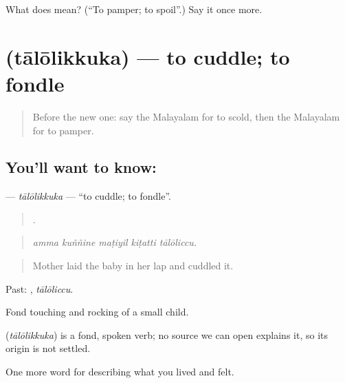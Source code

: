 \begin{tcolorbox}[breakable,colback=teal!4,colframe=teal!35!black,title={Before you move on}]
What does  mean? (\textquotedblleft{}To pamper; to spoil\textquotedblright{}.) Say it once more.
\end{tcolorbox}
\section[\texorpdfstring{\ml{താലോലിക്കുക} (tālōlikkuka)}{താലോലിക്കുക (tālōlikkuka)}]{ (tālōlikkuka) — to cuddle; to fondle}

\label{lesson:ML-C557-talolikkuka}



\begin{quote}
Before the new one: say the Malayalam for to scold, then the Malayalam for to pamper.
\end{quote}

\subsection*{You'll want to know: }
\textbf{} — \emph{tālōlikkuka} — \textquotedblleft{}to cuddle; to fondle\textquotedblright{}.

\begin{quote}
    .
\end{quote}

\begin{quote}
\emph{amma kuññine maṭiyil kiṭatti tālōliccu.}
\end{quote}

\begin{quote}
Mother laid the baby in her lap and cuddled it.
\end{quote}

Past: , \emph{tālōliccu}.

Fond touching and rocking of a small child.

\begin{cousinweb}
\textbf{} (\emph{tālōlikkuka}) is a fond, spoken verb; no source we can open explains it, so its origin is not settled.
\end{cousinweb}

\begin{grammarlens}[title={What you've built}]
One more word for describing what you lived and felt.
\end{grammarlens}

